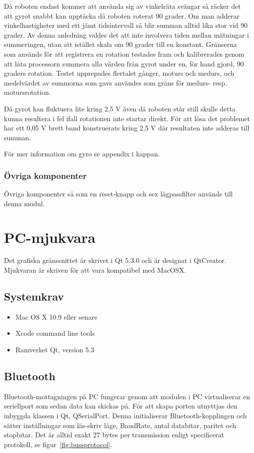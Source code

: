 \documentclass[a4paper,12pt,fleqn]{article}
\begin{document}
Då roboten endast kommer att använda sig av vinkelräta svängar så räcker det att gyrot snabbt kan upptäcka då roboten roterat 90 grader. Om man adderar vinkelhastigheter med ett jämt tidsintervall så blir summan alltid lika stor vid 90 grader. Av denna anledning valdes det att inte involvera tiden mellan mätningar i summeringen, utan att istället skala om 90 grader till en konstant.
Gränserna som används för att registrera en rotation testades fram och kalibrerades genom att låta processorn summera alla värden från gyrot under en, för hand gjord, 90 graders rotation. Testet upprepades flertalet gånger, moturs och medurs, och medelvärdet av summorna som gavs användes som gräns för medurs- resp. motursrotation.

Då gyrot kan fluktuera lite kring 2,5 V även då roboten står still skulle detta kunna resultera i fel ifall rotationen inte startar direkt. För att lösa det problemet har ett 0,05 V brett band konstruerats kring 2,5 V där resultaten inte adderas till summan. 

För mer information om gyro se appendix i kappan.

\subsubsection{Övriga komponenter}
Övriga komponenter så som en reset-knapp och sex lågpassfilter används till denna modul.



\newpage
\section{PC-mjukvara}
Det grafiska gränssnittet är skrivet i Qt 5.3.0 och är designat i QtCreator. Mjukvaran är skriven för att vara kompatibel med MacOSX.

\subsection{Systemkrav}
\begin{itemize}
	\item Mac OS X 10.9 eller senare
	\item Xcode command line tools
	\item Ramverket Qt, version 5.3
\end{itemize}

\subsection{Bluetooth}
Bluetooth-mottagningen på PC fungerar genom att modulen i PC virtualiserar en seriellport som sedan data kan skickas på. För att skapa porten utnyttjas den inbyggda klassen i Qt, QSerialPort. Denna initialiserar Bluetooth-kopplingen och sätter inställningar som läs-skriv läge, BaudRate, antal databitar, paritet och stopbitar. Det är alltid exakt 27 bytes per transmission enligt specificerat protokoll, se figur~\ref{fig:bussprotocol}. 
\end{document}
